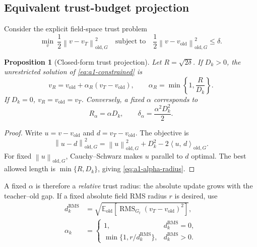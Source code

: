 \documentclass[11pt,a4paper]{article}
\newcommand{\E}{\mathbb{E}}
\newcommand{\norm}[1]{\left\lVert #1 \right\rVert}
\newcommand{\inner}[2]{\left\langle #1,\,#2 \right\rangle}
\newcommand{\vold}{v_{\mathrm{old}}}
\newcommand{\vT}{v_T}
\theoremstyle{plain}
\newtheorem{proposition}[theorem]{Proposition}
\theoremstyle{definition}
\begin{document}
\subsection{Equivalent trust-budget projection}

Consider the explicit field-space trust problem
\begin{equation}
\min_v\ \frac12\norm{v-\vT}_{\mathrm{old},G}^2
\quad\text{subject to}\quad
\frac12\norm{v-\vold}_{\mathrm{old},G}^2\le\delta .
\label{eq:a1-constrained}
\end{equation}

\begin{proposition}[Closed-form trust projection]
\label{prop:a1-trust-projection}
Let $R=\sqrt{2\delta}$.  If $D_k>0$, the unrestricted solution of
\eqref{eq:a1-constrained} is
\begin{equation}
v_R
=
\vold+\alpha_R(\vT-\vold),
\qquad
\alpha_R=\min\!\left\{1,\frac{R}{D_k}\right\}.
\label{eq:a1-alpha-radius}
\end{equation}
If $D_k=0$, $v_R=\vold=\vT$.  Conversely, a fixed $\alpha$ corresponds to
\begin{equation}
R_\alpha=\alpha D_k,
\qquad
\delta_\alpha=\frac{\alpha^2D_k^2}{2}.
\label{eq:a1-relative-radius}
\end{equation}
\end{proposition}

\begin{proof}
Write $u=v-\vold$ and $d=\vT-\vold$.  The objective is
\[
\norm{u-d}_{\mathrm{old},G}^2
=\norm{u}_{\mathrm{old},G}^2+D_k^2
-2\inner{u}{d}_{\mathrm{old},G}.
\]
For fixed $\norm{u}_{\mathrm{old},G}$, Cauchy--Schwarz makes $u$ parallel to $d$ optimal.
The best allowed length is $\min\{R,D_k\}$, giving \eqref{eq:a1-alpha-radius}.
\end{proof}

A fixed $\alpha$ is therefore a \emph{relative} trust radius: the absolute update grows with the
teacher--old gap.  If a fixed absolute field RMS radius $r$ is desired, use
\begin{align}
d_k^{\mathrm{RMS}}
&=
\sqrt{\E_{\mathrm{old}}[
  \operatorname{RMS}_{G_t}(\vT-\vold)^2
]},
\nonumber\\
\alpha_k
&=
\begin{cases}
1, & d_k^{\mathrm{RMS}}=0,\\
\min\{1,r/d_k^{\mathrm{RMS}}\}, & d_k^{\mathrm{RMS}}>0.
\end{cases}
\label{eq:a1-rms-alpha}
\end{align}
\end{document}
